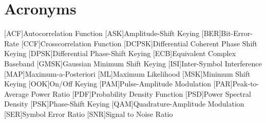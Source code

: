 \chapter{Acronyms}
\begin{acronym}[DCPSK]
    [ACF]{Autocorrelation Function}
    [ASK]{Amplitude-Shift Keying}
    [BER]{Bit-Error-Rate}
    [CCF]{Crosscorrelation Function}
    [DCPSK]{Differential Coherent Phase Shift Keying}
    [DPSK]{Differential Phase-Shift Keying}
    [ECB]{Equivalent Complex Baseband}
    [GMSK]{Gaussian Minimum Shift Keying}
    [ISI]{Inter-Symbol Interference}
    [MAP]{Maximum-a-Posteriori}
    [ML]{Maximum Likelihood}
    [MSK]{Minimum Shift Keying}
    [OOK]{On/Off Keying}
    [PAM]{Pulse-Amplitude Modulation}
    [PAR]{Peak-to-Average Power Ratio}
    [PDF]{Probability Density Function}
    [PSD]{Power Spectral Density}
    [PSK]{Phase-Shift Keying}
    [QAM]{Quadrature-Amplitude Modulation}
    [SER]{Symbol Error Ratio}
    [SNR]{Signal to Noise Ratio}
\end{acronym}
